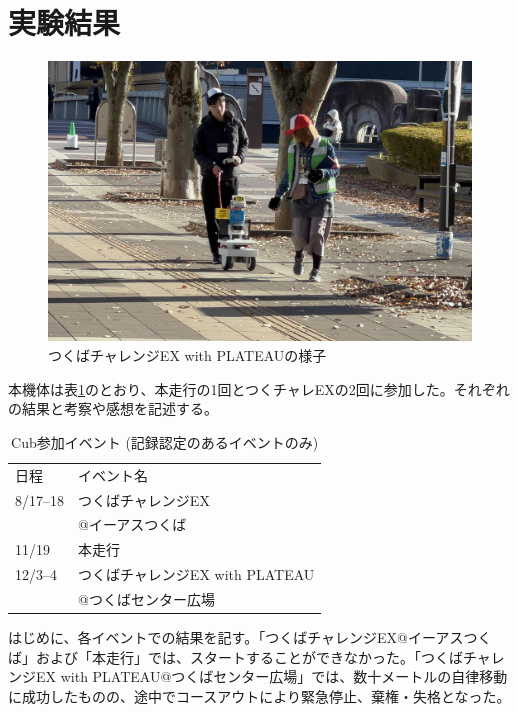 \documentclass[platex,dvipdfmx]{rbproceedings}
\begin{document}
\section{実験結果}
\begin{figure}
    \centering
    \includegraphics[width=0.8\linewidth]{picture/tc2023exp.jpg}
    \caption{つくばチャレンジEX with PLATEAUの様子}
    \label{fig:plateau_exp}
\end{figure}

本機体は表\ref{tab:cub_entry_events}のとおり、本走行の1回とつくチャレEXの2回に参加した。それぞれの結果と考察や感想を記述する。
\begin{table}
\centering
\caption{Cub参加イベント (記録認定のあるイベントのみ)}
\label{tab:cub_entry_events}
\begin{tabular}{ll}
\hline
日程& イベント名\\
 8/17--18& つくばチャレンジEX\\
 &@イーアスつくば\\
 11/19& 本走行\\
 12/3--4&つくばチャレンジEX with PLATEAU\\
& @つくばセンター広場\\
\hline
\end{tabular}
\end{table}

はじめに、各イベントでの結果を記す。「つくばチャレンジEX@イーアスつくば」および「本走行」では、スタートすることができなかった。「つくばチャレンジEX with PLATEAU@つくばセンター広場」では、数十メートルの自律移動に成功したものの、途中でコースアウトにより緊急停止、棄権・失格となった。\\
\end{document}
